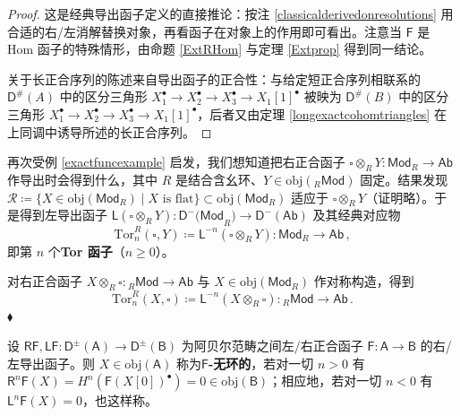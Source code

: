 \begin{proof}
	这是经典导出函子定义的直接推论：按注 \ref{classicalderivedonresolutions} 用合适的右/左消解替换对象，再看函子在对象上的作用即可看出。注意当 $\mathsf{F}$ 是 Hom 函子的特殊情形，由命题 \ref{ExtRHom} 与定理 \ref{Extprop} 得到同一结论。
	
	关于长正合序列的陈述来自导出函子的正合性：与给定短正合序列相联系的 $\mathsf{D}^\#\!(A)$ 中的区分三角形 $X_1^\bullet\rightarrow X_2^\bullet\rightarrow X_3^\bullet\rightarrow X_1[1]^\bullet$ 被映为 $\mathsf{D}^\#\!(B)$ 中的区分三角形 $X_1^\bullet\rightarrow X_2^\bullet\rightarrow X_3^\bullet\rightarrow X_1[1]^\bullet$，后者又由定理 \ref{longexactcohomtriangles} 在上同调中诱导所述的长正合序列。
\end{proof}

\begin{Ex}\label{Torfunc}
	再次受例 \ref{exactfuncexample} 启发，我们想知道把右正合函子 $\square\otimes_R Y:\mathsf{Mod}_R\rightarrow\mathsf{Ab}$ 作导出时会得到什么，其中 $R$ 是结合含幺环、$Y\in\text{obj}({}_R\mathsf{Mod})$ 固定。结果发现 $\mathcal{R}\coloneqq\{X\in\text{obj}(\mathsf{Mod}_R)\mid X\text{ is flat}\}\subset\text{obj}(\mathsf{Mod}_R)$ 适应于 $\square\otimes_R Y$（证明略）。于是得到左导出函子 $\mathsf{L}(\square\otimes_R Y):\mathsf{D^-(Mod}_R)\rightarrow\mathsf{D^-(Ab)}$ 及其经典对应物
	\begin{equation}
		\text{Tor}_n^R(\square,Y)\coloneqq\mathsf{L}^{-n}(\square\otimes_R Y):\mathsf{Mod}_R\rightarrow\mathsf{Ab}\,,
	\end{equation}
	即第 $n$ 个\textbf{Tor 函子}（$n\geq 0$）。
	
	对右正合函子 $X\otimes_R \square:{}_R\mathsf{Mod}\rightarrow\mathsf{Ab}$ 与 $X\in\text{obj}(\mathsf{Mod}_R)$ 作对称构造，得到
	\begin{equation}
		\text{Tor}^R_n(X,\square)\coloneqq\mathsf{L}^{-n}(X\otimes_R \square):{}_R\mathsf{\mathsf{Mod}}\rightarrow\mathsf{Ab}\,.
	\end{equation}
	\hfill $\blacklozenge$
\end{Ex}

\begin{Def}\label{Facyclic}
	设 $\mathsf{RF},\mathsf{LF}:\mathsf{D^\pm(A)}\rightarrow\mathsf{D^\pm(B)}$ 为阿贝尔范畴之间左/右正合函子 $\mathsf{F}:\mathsf{A}\rightarrow\mathsf{B}$ 的右/左导出函子。则 $X\in\text{obj}(\mathsf{A})$ 称为\textbf{$\mathsf{F}$-无环的}，若对一切 $n>0$ 有 $\mathsf{R}^n\mathsf{F}(X)=H^n(\mathsf{F}(X[0])^\bullet)=0\in\text{obj}(\mathsf{B})$；相应地，若对一切 $n<0$ 有 $\mathsf{L}^n\mathsf{F}(X)=0$，也这样称。
\end{Def}

